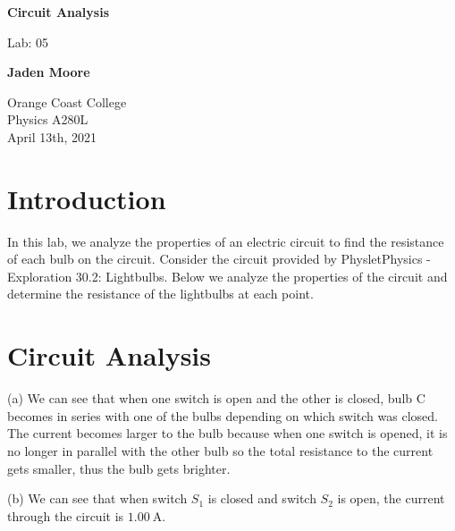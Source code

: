 \documentclass[12pt]{article}
\begin{document}

\begin{titlepage}
    \begin{center}
        \vspace*{1cm}
        \textbf{Circuit Analysis}

        \vspace{0.5cm}
        Lab: 05

        \vspace{1cm}

        \textbf{Jaden Moore}

        \vfill

        Orange Coast College\\
        Physics A280L\\
        April 13th, 2021

    \end{center}
\end{titlepage}

\pagestyle{fancy}
\fancyhf{}
\setlength{\headheight}{15pt}
\cfoot{\thepage}

\section{Introduction}
In this lab, we analyze the properties of an electric circuit to find the resistance of each bulb on the circuit. Consider the circuit provided by Physlet\textregistered \space Physics - Exploration 30.2: Lightbulbs. Below we analyze the properties of the circuit and determine the resistance of the lightbulbs at each point.

\section{Circuit Analysis}
\bigskip

(a) We can see that when one switch is open and the other is closed, bulb C becomes in series with one of the bulbs depending on which switch was closed. The current becomes larger to the bulb because when one switch is opened, it is no longer in parallel with the other bulb so the total resistance to the current gets smaller, thus the bulb gets brighter.

\bigskip

(b) We can see that when switch $S_1$ is closed and switch $S_2$ is open, the current through the circuit is $\SI{1.00}{\ampere}$.

\bigskip
\end{document}

